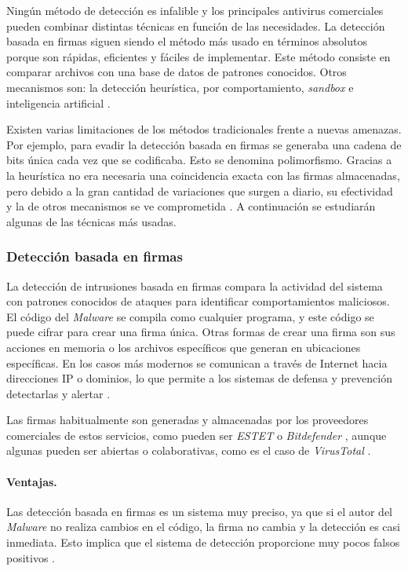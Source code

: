 Ningún método de detección es infalible y los principales antivirus comerciales pueden combinar distintas técnicas en función de las necesidades. La detección basada en firmas siguen siendo el método más usado en términos absolutos porque son rápidas, eficientes y fáciles de implementar. Este método consiste en comparar archivos con una base de datos de patrones conocidos. Otros mecanismos son: la detección heurística, por comportamiento, \textit{sandbox} e inteligencia artificial \cite{antivirus}.

\vspace{1em}

Existen varias limitaciones de los métodos tradicionales frente a nuevas amenazas. Por ejemplo, para evadir la detección basada en firmas se generaba una cadena de bits única cada vez que se codificaba. Esto se denomina polimorfismo. Gracias a la heurística no era necesaria una coincidencia exacta con las firmas almacenadas, pero debido a la gran cantidad de variaciones que surgen a diario, su efectividad y la de otros mecanismos se ve comprometida \cite{limitaciones}. A continuación se estudiarán algunas de las técnicas más usadas.

\subsubsection{Detección basada en firmas}
\label{subsubsec:firmas}

La detección de intrusiones basada en firmas compara la actividad del sistema con patrones conocidos de ataques para identificar comportamientos maliciosos. El código del \textit{Malware} se compila como cualquier programa, y este código se puede cifrar para crear una firma única. Otras formas de crear una firma son sus acciones en memoria o los archivos específicos que generan en ubicaciones específicas. En los casos más modernos se comunican a través de Internet hacia direcciones IP o dominios, lo que permite a los sistemas de defensa y prevención detectarlas y alertar \cite{firmas1}.

\vspace{1em}

Las firmas habitualmente son generadas y almacenadas por los proveedores comerciales de estos servicios, como pueden ser \textit{ESTET} \cite{eset} o \textit{Bitdefender} \cite{bitdefender}, aunque algunas pueden ser abiertas o colaborativas, como es el caso de \textit{VirusTotal} \cite{virustotal}.

\newpage
\paragraph*{\textbf{Ventajas.}}
Las detección basada en firmas es un sistema muy preciso, ya que si el autor del \textit{Malware} no realiza cambios en el código, la firma no cambia y la detección es casi inmediata. Esto implica que el sistema de detección proporcione muy pocos falsos positivos \cite{firmas1}.

